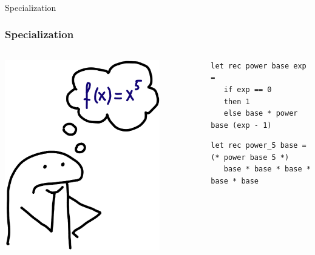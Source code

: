 \documentclass[xcolor={dvipsnames}, aspectratio=169]{beamer}
\begin{document}
\begin{frame}[fragile]
  \frametitle{}

\begin{center}
  \Large Specialization
\end{center}

\end{frame}


\begin{frame}[fragile]
  \frametitle{Specialization}

  \begin{columns}    
    \begin{column}{0.35\textwidth}
      \centering
      \includegraphics[width=0.8\textwidth]{pic/power.jpg}
    \end{column}
    \begin{column}{0.75\textwidth} 
      \begin{lstlisting}[language=ocanren]
 let rec power base exp = 
   if exp == 0 
   then 1 
   else base * power base (exp - 1)
          \end{lstlisting}

          \begin{lstlisting}[language=ocanren]
 let rec power_5 base =                    (* power base 5 *)
   base * base * base * base * base 
           \end{lstlisting}
        \end{column}
        \end{columns}

\end{frame}
\end{document}
